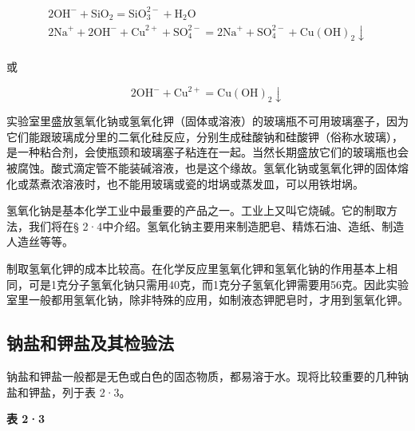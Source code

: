 \[
\begin{array}{l} 2 \mathrm{OH} ^ {-} + \mathrm{SiO} _ {2} = \mathrm{SiO} _ {3}^{2-} + \mathrm{H} _ {2} \mathrm{O} \\ 2 \mathrm{Na} ^ {+} + 2 \mathrm{OH} ^ {-} + \mathrm{Cu} ^{2+} + \mathrm{SO} _ {4}^{2-} = 2 \mathrm{Na} ^ {+} + \mathrm{SO} _ {4}^{2-} + \mathrm{Cu(OH)} _ {2} \downarrow \\ \end{array}
\]

或

\[
2 \mathrm{OH} ^ {-} + \mathrm{Cu} ^{2+} = \mathrm{Cu(OH)} _ {2} \downarrow
\]

实验室里盛放氢氧化钠或氢氧化钾（固体或溶液）的玻璃瓶不可用玻璃塞子，因为它们能跟玻璃成分里的二氧化硅反应，分别生成硅酸钠和硅酸钾（俗称水玻璃），是一种粘合剂，会使瓶颈和玻璃塞子粘连在一起。当然长期盛放它们的玻璃瓶也会被腐蚀。酸式滴定管不能装碱溶液，也是这个缘故。氢氧化钠或氢氧化钾的固体熔化或蒸煮浓溶液时，也不能用玻璃或瓷的坩埚或蒸发皿，可以用铁坩埚。

氢氧化钠是基本化学工业中最重要的产品之一。工业上又叫它烧碱。它的制取方法，我们将在§
2·4中介绍。氢氧化钠主要用来制造肥皂、精炼石油、造纸、制造人造丝等等。

制取氢氧化钾的成本比较高。在化学反应里氢氧化钾和氢氧化钠的作用基本上相同，可是1克分子氢氧化钠只需用40克，而1克分子氢氧化钾需要用56克。因此实验室里一般都用氢氧化钠，除非特殊的应用，如制液态钾肥皂时，才用到氢氧化钾。

\subsection{钠盐和钾盐及其检验法}

钠盐和钾盐一般都是无色或白色的固态物质，都易溶于水。现将比较重要的几种钠盐和钾盐，列于表
2·3。

\textbf{表 2·3}

